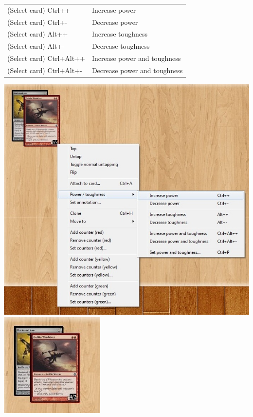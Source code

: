 \documentclass[a4paper]{scrbook}
\begin{document}
\begin{center}
\begin{tabular}{ll}
(Select card) Ctrl++ & Increase power \\
(Select card) Ctrl+- & Decrease power \\
(Select card) Alt++ & Increase toughness \\
(Select card) Alt+- & Decrease toughness \\
(Select card) Ctrl+Alt++ & Increase power and toughness \\
(Select card) Ctrl+Alt+- & Decrease power and toughness
\end{tabular}
\includegraphics[scale=0.5]{pics/fetche3fc}\\
\includegraphics{pics/fetchd922}
\end{center}
\end{document}
